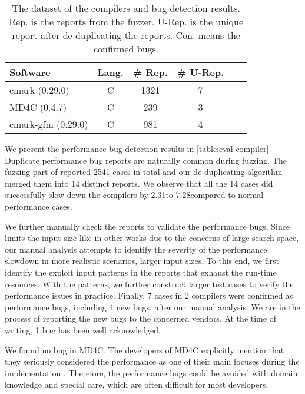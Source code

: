 \begin{table}[t]
\centering
\caption{The dataset of the compilers and bug detection results.
Rep. is the reports from the fuzzer.
U-Rep. is the unique report after de-duplicating the reports.
Con. means the confirmed bugs.
    }
\label{table:eval-compiler}
\small
\begin{tabular}{lccccc}
   \toprule
    Software & Lang. & \# Rep. & \# U-Rep. \\
    \midrule
    cmark (0.29.0) &C & 1321 & 7  \\
    MD4C (0.4.7) & C & 239 & 3  \\ 
    cmark-gfm (0.29.0) & C & 981 & 4 \\
    \bottomrule
\end{tabular}
\end{table}




%

%
%
We present the performance bug detection results in \autoref{table:eval-compiler}.
%
Duplicate performance bug reports are naturally common during fuzzing.
%
The fuzzing part of \sys reported \num{2541} cases in total and our de-duplicating algorithm merged them into 14 distinct reports.
%
We observe that all the 14 cases did successfully slow down the compilers by 2.31\x to 7.28\x compared to normal-performance cases.
%

We further manually check the reports to validate the performance bugs.
%
Since \sys limits the input size like in other works \cite{oss-fuzz, slowfuzz, perffuzz} due to the concerns of large search space, 
%
our manual analysis attempts to identify the severity of the performance slowdown in more realistic scenarios, \ie{,} larger input sizes.
%
To this end, we first identify the exploit input patterns in the reports that exhaust the run-time resources.
%
With the patterns, we further construct larger test cases to verify the performance issues in practice.
%
Finally, 7 cases in 2 compilers were confirmed as performance bugs, including 4 new bugs, after our manual analysis.
%
We are in the process of reporting the new bugs to the concerned vendors.
At the time of writing, 1 bug has been well acknowledged.

We found no bug in MD4C.
%
The developers of MD4C explicitly mention that they seriously considered the performance as one of their main focuses during the implementation \cite{md4c}.
%
Therefore, the performance bugs could be avoided with domain knowledge and special care, which are often difficult for most developers.
%
%

